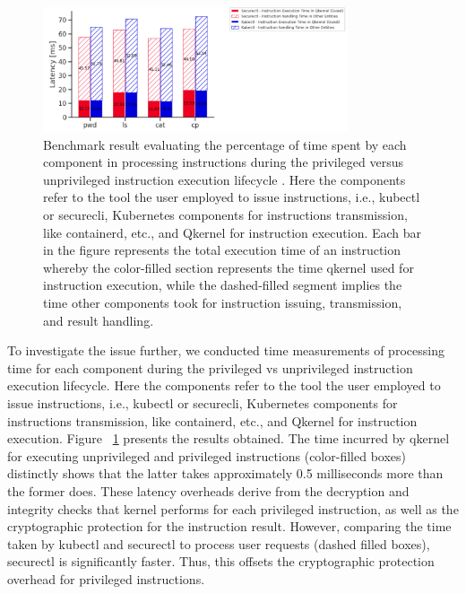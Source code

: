 \begin{figure}[H]
    \centering
    \includegraphics[width=0.8\textwidth]{images/timeshare_issuing_cmd_in_cquark_kubectl_securectl.PNG}
    \caption[Benchmark result - The processing time for components during the privileged vs unprivileged instruction execution lifecycle]{Benchmark result evaluating the percentage of time spent by each component in processing instructions during the privileged versus unprivileged instruction 
    execution lifecycle . Here the components refer to the tool the user employed to issue instructions, i.e., kubectl or securecli,  Kubernetes components for instructions transmission, like containerd, etc., and Qkernel for instruction execution.  Each bar in the 
    figure represents the total execution time of an instruction whereby the color-filled section represents the time qkernel used for instruction execution, while the dashed-filled segment implies the time other components took for instruction issuing, transmission, and result handling.
    }
    \label{fig:timeshare_issuing_cmd_in_cquark_kubectl_securectl}
\end{figure}

To investigate the issue further, we conducted time  measurements of processing time for each component during the privileged vs unprivileged instruction execution lifecycle. Here the components refer to the tool the user employed 
to issue instructions, i.e., kubectl or securecli,  Kubernetes components for instructions transmission, like containerd, etc., and Qkernel for instruction execution.
Figure ~\ref{fig:timeshare_issuing_cmd_in_cquark_kubectl_securectl} presents the results obtained. The time incurred by qkernel for executing unprivileged and privileged instructions (color-filled boxes) distinctly shows that the latter takes approximately 0.5 milliseconds more than the former does. These latency overheads derive from the decryption and 
integrity checks that kernel performs for each privileged instruction, as well as the cryptographic protection for the instruction result. However, comparing the time taken by kubectl and securectl to process user requests (dashed filled boxes), securectl is significantly faster. Thus, this 
offsets the cryptographic protection overhead for privileged instructions.


